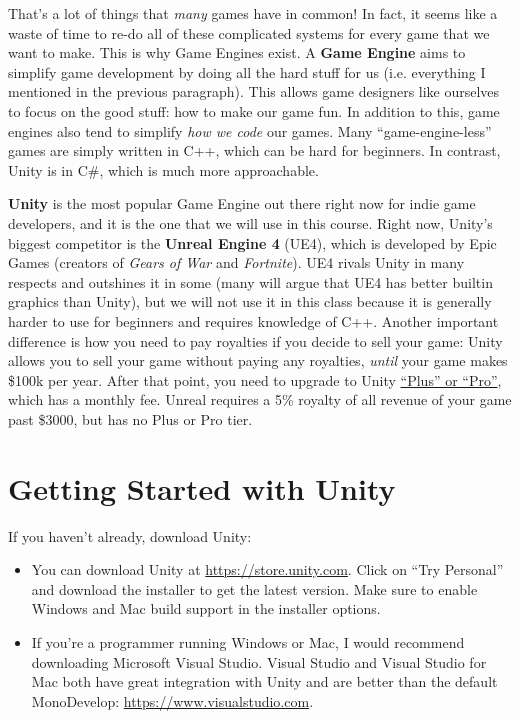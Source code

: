 \documentclass[11pt]{article}
\begin{document}
\par That's a lot of things that {\it many} games have in common!  In fact, it seems like a waste of time to re-do all of these complicated systems for every game that we want to make.  This is why Game Engines exist.  A {\bf Game Engine} aims to simplify game development by doing all the hard stuff for us (i.e. everything I mentioned in the previous paragraph).  This allows game designers like ourselves to focus on the good stuff: how to make our game fun.  In addition to this, game engines also tend to simplify {\it how we code} our games.  Many ``game-engine-less'' games are simply written in C++, which can be hard for beginners.  In contrast, Unity is in C\#, which is much more approachable.


{\bf Unity} is the most popular Game Engine out there right now for indie game developers, and it is the one that we will use in this course.  Right now, Unity's biggest competitor is the {\bf Unreal Engine 4} (UE4), which is developed by Epic Games (creators of {\it Gears of War} and {\it Fortnite}).  UE4 rivals Unity in many respects and outshines it in some (many will argue that UE4 has better builtin graphics than Unity), but we will not use it in this class because it is generally harder to use for beginners and requires knowledge of C++.  Another important difference is how you need to pay royalties if you decide to sell your game: Unity allows you to sell your game without paying any royalties, {\it until} your game makes \$100k per year.  After that point, you need to upgrade to Unity \href{https://store.unity.com}{``Plus'' or ``Pro''}, which has a monthly fee.  Unreal requires a 5\% royalty of all revenue of your game past \$3000, but has no Plus or Pro tier.

\section{Getting Started with Unity}

If you haven't already, download Unity:
\begin{itemize}
\item You can download Unity at \href{https://store.unity.com}{https://store.unity.com}.  Click on ``Try Personal'' and download the installer to get the latest version.  Make sure to enable Windows and Mac build support in the installer options.
\item If you're a programmer running Windows or Mac, I would recommend downloading Microsoft Visual Studio.  Visual Studio and Visual Studio for Mac both have great integration with Unity and are better than the default MonoDevelop: \href{https://www.visualstudio.com}{https://www.visualstudio.com}.
\end{itemize}
\end{document}
